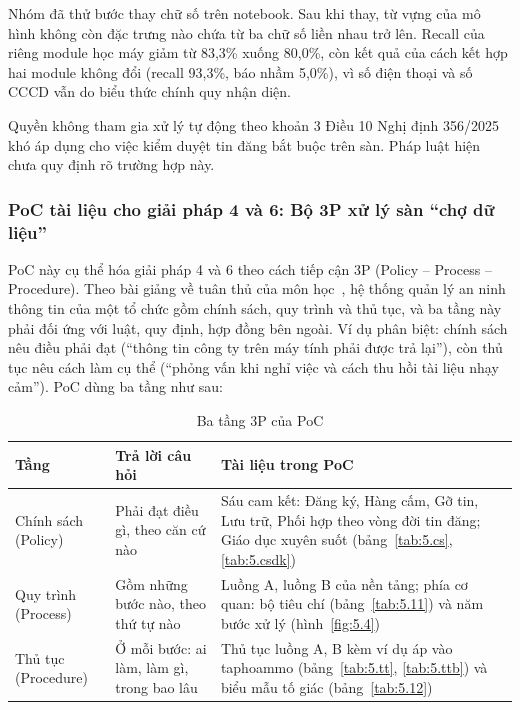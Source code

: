 Nhóm đã thử bước thay chữ số trên notebook. Sau khi thay, từ vựng của mô hình không còn đặc trưng nào chứa từ ba chữ số liền nhau trở lên. Recall của riêng module học máy giảm từ 83,3\% xuống 80,0\%, còn kết quả của cách kết hợp hai module không đổi (recall 93,3\%, báo nhầm 5,0\%), vì số điện thoại và số CCCD vẫn do biểu thức chính quy nhận diện.

Quyền không tham gia xử lý tự động theo khoản 3 Điều 10 Nghị định 356/2025 khó áp dụng cho việc kiểm duyệt tin đăng bắt buộc trên sàn. Pháp luật hiện chưa quy định rõ trường hợp này.

\subsubsection{PoC tài liệu cho giải pháp 4 và 6: Bộ 3P xử lý sàn “chợ dữ liệu”}\label{sec:5.2.2}

PoC này cụ thể hóa giải pháp 4 và 6 theo cách tiếp cận 3P (Policy -- Process -- Procedure). Theo bài giảng về tuân thủ của môn học~\cite{lpsc-l6}, hệ thống quản lý an ninh thông tin của một tổ chức gồm chính sách, quy trình và thủ tục, và ba tầng này phải đối ứng với luật, quy định, hợp đồng bên ngoài. Ví dụ phân biệt: chính sách nêu điều phải đạt (“thông tin công ty trên máy tính phải được trả lại”), còn thủ tục nêu cách làm cụ thể (“phỏng vấn khi nghỉ việc và cách thu hồi tài liệu nhạy cảm”). PoC dùng ba tầng như sau:

{\small{}
\begin{table}[H]
\centering
\caption{Ba tầng 3P của PoC}\label{tab:5.3p}
\begin{tabularx}{\textwidth}{>{\raggedright\arraybackslash}l>{\hsize=0.8\hsize\raggedright\arraybackslash}X>{\hsize=1.2\hsize\raggedright\arraybackslash}X}
\toprule
\textbf{Tầng} & \textbf{Trả lời câu hỏi} & \textbf{Tài liệu trong PoC} \\
\midrule
Chính sách (Policy) & Phải đạt điều gì, theo căn cứ nào & Sáu cam kết: Đăng ký, Hàng cấm, Gỡ tin, Lưu trữ, Phối hợp theo vòng đời tin đăng; Giáo dục xuyên suốt (bảng~\ref{tab:5.cs}, \ref{tab:5.csdk}) \\
Quy trình (Process) & Gồm những bước nào, theo thứ tự nào & Luồng A, luồng B của nền tảng; phía cơ quan: bộ tiêu chí (bảng~\ref{tab:5.11}) và năm bước xử lý (hình~\ref{fig:5.4}) \\
Thủ tục (Procedure) & Ở mỗi bước: ai làm, làm gì, trong bao lâu & Thủ tục luồng A, B kèm ví dụ áp vào taphoammo (bảng~\ref{tab:5.tt}, \ref{tab:5.ttb}) và biểu mẫu tố giác (bảng~\ref{tab:5.12}) \\
\bottomrule
\end{tabularx}
\end{table}}

